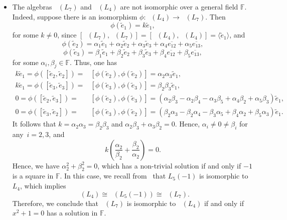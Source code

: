 \documentclass[11pt,a4paper]{amsart}
\theoremstyle{plain}
\theoremstyle{definition}
\theoremstyle{remark}
\numberwithin{equation}{section}
\newcommand{\0}{\emptyset}
\newcommand{\bF}{\mathbb{F}}
\DeclareMathOperator{\ZL}{Z_{Lie}}
\DeclareMathOperator{\holL}{hol_{Lie}}
\newcommand{\ov}[1]{\overline{#1}}
\begin{document}
\begin{itemize}[itemsep=0.35em]
	\item The algebras $\holL(L_7)$ and $\holL(L_4)$ are not isomorphic over a general field $\bF$. Indeed, suppose there is an isomorphism $\phi \colon \holL(L_4) \to \holL(L_7)$. Then
	      \[
	      	\phi(\widetilde{e}_1)=k\widetilde{e}_1,
	      \]
	      for some $k \neq 0$, since $\left[\holL(L_7),\holL(L_7) \right]=\left[\holL(L_4),\holL(L_4) \right]=\langle \widetilde{e}_1 \rangle$, and
	      \[
	      	\phi(\widetilde{e}_2)=\alpha_1 \widetilde{e}_1+\alpha_2\widetilde{e}_2+\alpha_3\widetilde{e}_3+\alpha_4\ov{e_{12}}+\alpha_5 \ov{e_{13}},
	      \]
	      \[
	      	\phi(\widetilde{e}_3)=\beta_1 \widetilde{e}_1+\beta_2\widetilde{e}_2+\beta_3\widetilde{e}_3+\beta_4\ov{e_{12}}+\beta_5 \ov{e_{13}},
	      \]
	      for some $\alpha_i,\beta_j \in \bF$. Thus, one has
	      \begin{align*}
	      	k \widetilde{e}_1=\phi([\widetilde{e}_2,\widetilde{e}_2])= & [\phi(\widetilde{e}_2),\phi(\widetilde{e}_2)]=\alpha_2 \alpha_3 \widetilde{e}_1,                                                                            \\
	      	k \widetilde{e}_1=\phi([\widetilde{e}_3,\widetilde{e}_3])= & [\phi(\widetilde{e}_3),\phi(\widetilde{e}_3)]=\beta_2 \beta_3 \widetilde{e}_1,                                                                              \\
	      	0=\phi([\widetilde{e}_2,\widetilde{e}_3])=                 & [\phi(\widetilde{e}_2),\phi(\widetilde{e}_3)]=(\alpha_2 \beta_3 - \alpha_2\beta_4 - \alpha_3 \beta_5 +\alpha_4 \beta_2 + \alpha_5 \beta_3) \widetilde{e}_1, \\
	      	0=\phi([\widetilde{e}_3,\widetilde{e}_2])=                 & [\phi(\widetilde{e}_3),\phi(\widetilde{e}_2)]=(\beta_2 \alpha_3 - \beta_2\alpha_4 - \beta_3 \alpha_5 +\beta_4 \alpha_2 + \beta_5 \alpha_3) \widetilde{e}_1. 
	      \end{align*}
	      It follows that $k=\alpha_2\alpha_3=\beta_2\beta_3$ and $\alpha_2 \beta_3+\alpha_3 \beta_2=0$. Hence, $\alpha_i \neq 0 \neq \beta_i$ for any~$i=2,3$, and
	      \[
	      	k\left(\dfrac{\alpha_2}{\beta_2}+\dfrac{\beta_2}{\alpha_2}\right)=0.
	      \]
	      Hence, we have $\alpha_2^2+\beta_2^2=0$, which has a non-trivial solution if and only if $-1$ is a square in $\bF$. In this case, we recall from~\cite{3-dimF} that $L_5(-1)$ is isomorphic to $L_4$, which implies
	      \[
	      	\holL(L_4) \cong \holL(L_5(-1)) \cong \holL(L_7).
	      \]
	      Therefore, we conclude that $\holL(L_7)$ is isomorphic to $\holL(L_4)$ if and only if $x^2+1=0$ has a solution in $\bF$. 
	      

\end{itemize}
\end{document}
